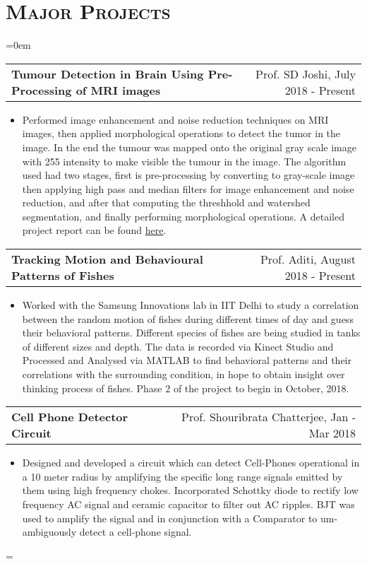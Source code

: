 \documentclass{article}
\makeatletter
\newenvironment{longversion}{}{} %
\newenvironment{absolutelynopagebreak}
  {\par\nobreak\vfil\penalty0\vfilneg
   \vtop\bgroup}
  {\par\xdef\tpd{\the\prevdepth}\egroup
   \prevdepth=\tpd}
\newcommand{\headerrow}[2]
{\begin{tabular*}{\linewidth}{l@{\extracolsep{\fill}}r}
	#1 &
	#2 \\
\end{tabular*}}
\newcommand{\tmpsection}[1]{}
\let\tmpsection=\section
\renewcommand{\section}[1]{\tmpsection*{\textsc{#1}}}
\makeatother
\begin{document}
\begin{absolutelynopagebreak}
\begin{longversion}
\section{Major Projects}
\begin{list} {}{\leftmargin=0em}
\setlength{\leftmargin}{0pt}

\item[]
\headerrow { \textbf{Tumour Detection in Brain Using Pre-Processing of MRI images}} {Prof. SD Joshi, July 2018 - Present}
 \begin{itemize} \item[]
Performed image enhancement and noise reduction
techniques on MRI images, then applied morphological operations to detect the tumor in the image. In the end the tumour was mapped onto
the original gray scale image with 255 intensity to make
visible the tumour in the image.
The algorithm used had two stages, first is pre-processing by converting to gray-scale image then applying high pass and median filters for image enhancement and noise reduction, and after that computing the threshhold and watershed segmentation, and finally performing morphological operations. A detailed project report can be found  \href{https://drive.google.com/file/d/1SlMhfu_FqdmNmo-ZZoaVuqLGvVw4tHOT/view?usp=sharing}{here}.
 \end{itemize}
 
 \headerrow { \textbf{Tracking Motion and Behavioural Patterns of Fishes}} {Prof. Aditi, August 2018 - Present}
 \begin{itemize} \item[]
 Worked with the Samsung Innovations lab in IIT Delhi to study a correlation between the random motion of fishes during different times of day and guess their behavioral patterns. Different species of fishes are being studied in tanks of different sizes and depth. The data is recorded via Kinect Studio and Processed and Analysed via MATLAB to find behavioral patterns and their correlations with the surrounding condition, in hope to obtain insight over thinking process of fishes. Phase 2 of the project to begin in October, 2018.
 \end{itemize}

 \item[]
\headerrow { \textbf{Cell Phone Detector Circuit}} {Prof. Shouribrata Chatterjee, Jan - Mar 2018}
 \begin{itemize} \item[]
 Designed and developed a circuit which can detect Cell-Phones operational in a 10 meter radius by amplifying the specific long range signals emitted by them using high frequency chokes. Incorporated Schottky diode to rectify low frequency AC signal and ceramic capacitor to filter out AC ripples. BJT was used to amplify the signal and in conjunction with a Comparator to um-ambiguously detect a cell-phone signal.
 \end{itemize}
 

\end{list}
\end{longversion}
\end{absolutelynopagebreak}
\end{document}
